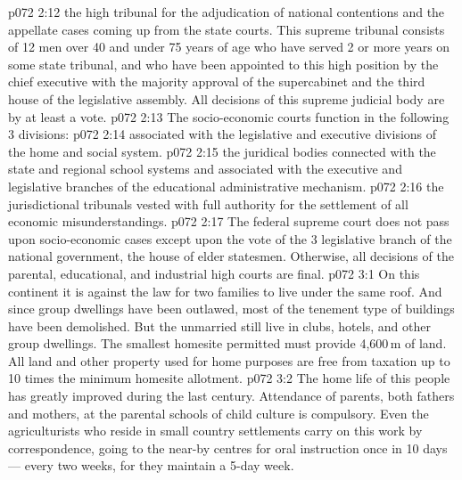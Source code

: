\vs p072 2:12 \bibnobreakspace {} the high tribunal for the adjudication of national contentions and the appellate cases coming up from the state courts. This supreme tribunal consists of 12 men over 40 and under 75 years of age who have served 2 or more years on some state tribunal, and who have been appointed to this high position by the chief executive with the majority approval of the supercabinet and the third house of the legislative assembly. All decisions of this supreme judicial body are by at least a  vote.
\vs p072 2:13 \pc The socio\hyp{}economic courts function in the following 3 divisions:
\vs p072 2:14 \bibnobreakspace {} associated with the legislative and executive divisions of the home and social system.
\vs p072 2:15 \bibnobreakspace {} the juridical bodies connected with the state and regional school systems and associated with the executive and legislative branches of the educational administrative mechanism.
\vs p072 2:16 \bibnobreakspace {} the jurisdictional tribunals vested with full authority for the settlement of all economic misunderstandings.
\vs p072 2:17 \pc The federal supreme court does not pass upon socio\hyp{}economic cases except upon the  vote of the 3 legislative branch of the national government, the house of elder statesmen. Otherwise, all decisions of the parental, educational, and industrial high courts are final.
\vs p072 3:1 On this continent it is against the law for two families to live under the same roof. And since group dwellings have been outlawed, most of the tenement type of buildings have been demolished. But the unmarried still live in clubs, hotels, and other group dwellings. The smallest homesite permitted must provide 4,600\,m of land. All land and other property used for home purposes are free from taxation up to 10 times the minimum homesite allotment.
\vs p072 3:2 The home life of this people has greatly improved during the last century. Attendance of parents, both fathers and mothers, at the parental schools of child culture is compulsory. Even the agriculturists who reside in small country settlements carry on this work by correspondence, going to the near\hyp{}by centres for oral instruction once in 10 days --- every two weeks, for they maintain a 5\hyp{}day week.
